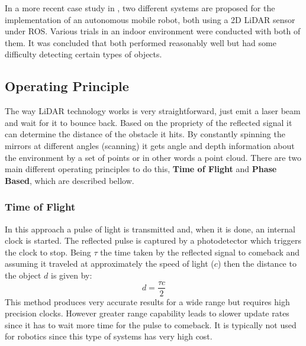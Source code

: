 In a more recent case study in \cite{lidar2019ros}, two different systems are proposed for the implementation of an autonomous  mobile robot, both using a 2D \ac{LiDAR} sensor under \ac{ROS}. Various trials in an indoor environment were conducted with both of them. It was concluded that both performed reasonably well but had some difficulty detecting certain types of objects.  

\subsection{Operating Principle}
The way \ac{LiDAR} technology works is very straightforward, just emit a laser beam and wait for it to bounce back. Based on the propriety of the reflected signal it can determine the distance of the obstacle it hits. By constantly spinning the mirrors at different angles (scanning) it gets angle and depth information about the environment  by a  set of points or in other words a point cloud. There are two main different operating principles to do this, \textbf{Time of Flight} and \textbf{Phase Based}, which are described bellow.
\subsubsection{Time of Flight}
 In this approach a pulse of light is transmitted and,  when it is done, an internal clock is started. The reflected pulse is captured by a photodetector which triggers the clock to stop. Being $\tau$ the time taken by the reflected signal to  comeback and assuming it traveled at approximately the speed of light ($c$) then the distance to the object $d$ is given by:
\begin{equation}
    d=\frac{\tau c}{2}
\end{equation}
This method produces very accurate results for a wide range but requires high precision clocks. However greater  range capability leads to slower update rates since it has to wait more time for the pulse to comeback.
It is typically not used for robotics since this type of systems has very high cost.
